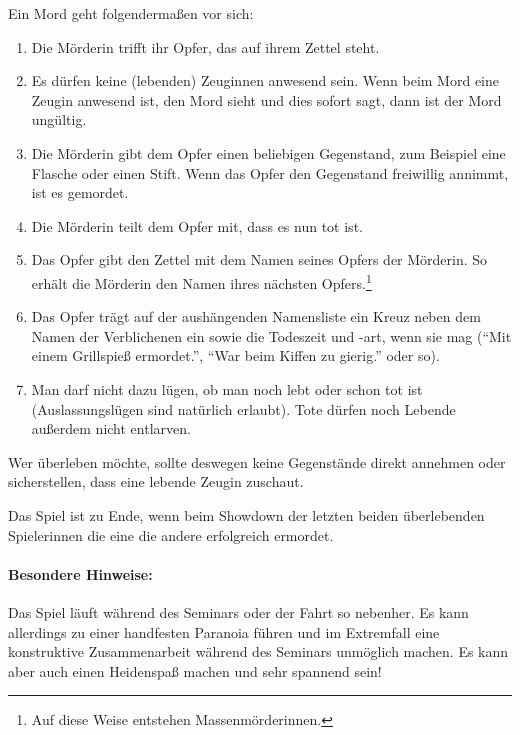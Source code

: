 Ein Mord geht folgendermaßen vor sich:
	\begin{enumerate}
		\item Die Mörderin trifft ihr Opfer, das auf ihrem Zettel steht.
		\item Es dürfen keine (lebenden) Zeuginnen anwesend sein. Wenn beim Mord eine Zeugin anwesend ist, den Mord sieht und dies sofort sagt, dann ist der Mord ungültig.
		\item Die Mörderin gibt dem Opfer einen beliebigen Gegenstand, zum Beispiel eine Flasche oder einen Stift. Wenn das Opfer den Gegenstand freiwillig annimmt, ist es gemordet.
		\item Die Mörderin teilt dem Opfer mit, dass es nun tot ist.
		\item Das Opfer gibt den Zettel mit dem Namen seines Opfers der Mörderin. So erhält die Mörderin den Namen ihres nächsten Opfers.\footnote{Auf diese Weise entstehen Massenmörderinnen.}
		\item Das Opfer trägt auf der aushängenden Namensliste ein Kreuz neben dem Namen der Verblichenen ein sowie die Todeszeit und -art, wenn sie mag ("`Mit einem Grillspieß ermordet."', "`War beim Kiffen zu gierig."' oder so).
		\item Man darf nicht dazu lügen, ob man noch lebt oder schon tot ist (Auslassungslügen sind natürlich erlaubt). Tote dürfen noch Lebende außerdem nicht entlarven.
	\end{enumerate}
Wer überleben möchte, sollte deswegen keine Gegenstände direkt annehmen oder sicherstellen, dass eine lebende Zeugin zuschaut.

Das Spiel ist zu Ende, wenn beim Showdown der letzten beiden überlebenden Spielerinnen die eine die andere erfolgreich ermordet.
\paragraph{Besondere Hinweise:} Das Spiel läuft während des Seminars oder der Fahrt so nebenher. Es kann allerdings zu einer handfesten Paranoia führen und im Extremfall eine konstruktive Zusammenarbeit während des Seminars unmöglich machen. Es kann aber auch einen Heidenspaß machen und sehr spannend sein!
